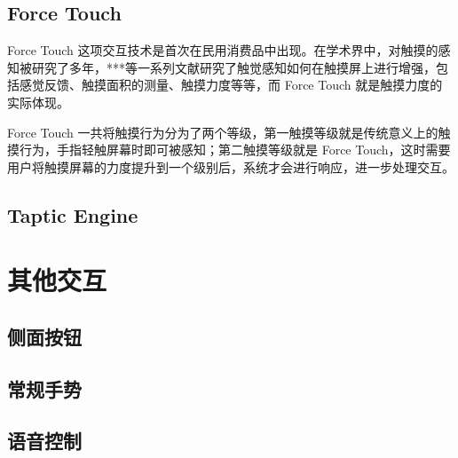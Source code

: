 \subsection{Force Touch}

Force Touch 这项交互技术是首次在民用消费品中出现。在学术界中，对触摸的感知被研究了多年，***等一系列文献研究了触觉感知如何在触摸屏上进行增强，包括感觉反馈、触摸面积的测量、触摸力度等等，而 Force Touch 就是触摸力度的实际体现。

Force Touch 一共将触摸行为分为了两个等级，第一触摸等级就是传统意义上的触摸行为，手指轻触屏幕时即可被感知；第二触摸等级就是 Force Touch，这时需要用户将触摸屏幕的力度提升到一个级别后，系统才会进行响应，进一步处理交互。

\subsection{Taptic Engine}

\section{其他交互}

\subsection{侧面按钮}

\subsection{常规手势}

\subsection{语音控制}
